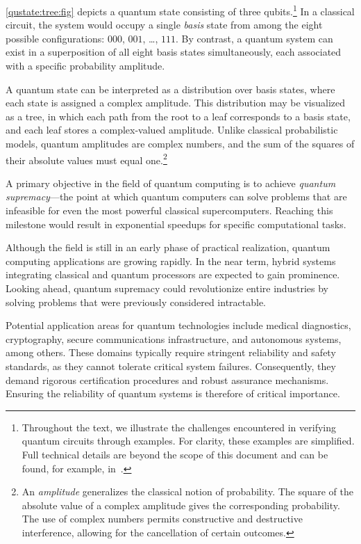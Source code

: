 \cref{qustate:tree:fig} depicts a quantum state consisting of three qubits.\footnote{Throughout the text, we illustrate the challenges encountered in verifying quantum circuits through examples. %
For clarity, these examples are simplified. Full technical details are beyond the scope of this document and can be found, for example, in~\cite{10.5555/1408782}.} In a classical circuit, the system would occupy a single \emph{basis} state from among the eight possible configurations: $000$, $001$, \ldots, $111$. %
By contrast, a quantum system can exist in a superposition of all eight basis states simultaneously, each associated with a specific probability amplitude.

A quantum state can be interpreted as a distribution over basis states, where each state is assigned a complex amplitude. This distribution may be visualized as a tree, in which each path from the root to a leaf corresponds to a basis state, and each leaf stores a complex-valued amplitude. %
Unlike classical probabilistic models, quantum amplitudes are complex numbers, and the sum of the squares of their absolute values must equal one.\footnote{An \emph{amplitude} generalizes the classical notion of probability. The square of the absolute value of a complex amplitude gives the corresponding probability. The use of complex numbers permits constructive and destructive interference, allowing for the cancellation of certain outcomes.} %

A primary objective in the field of quantum computing is to achieve \emph{quantum supremacy}---the point at which quantum computers can solve problems that are infeasible for even the most powerful classical supercomputers. %
Reaching this milestone would result in exponential speedups for specific computational tasks. %

Although the field is still in an early phase of practical realization, quantum computing applications are growing rapidly. %
In the near term, hybrid systems integrating classical and quantum processors are expected to gain prominence. Looking ahead, quantum supremacy could revolutionize entire industries by solving problems that were previously considered intractable. %

Potential application areas for quantum technologies include medical diagnostics, cryptography, secure communications infrastructure, and autonomous systems, among others. %
These domains typically require stringent reliability and safety standards, as they cannot tolerate critical system failures. Consequently, they demand rigorous certification procedures and robust assurance mechanisms. Ensuring the reliability of quantum systems is therefore of critical importance. %


